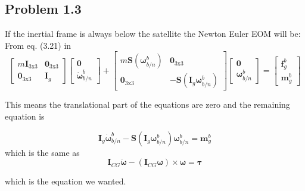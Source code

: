 \subsection*{Problem 1.3}
If the inertial frame is always below the satellite the Newton Euler EOM will be:\\From eq. (3.21) in \cite{Fossen2011}
\begin{equation}
    \begin{bmatrix}
        m\boldsymbol{I}_{3\text{x}3} & \boldsymbol{0}_{3\text{x}3}\\
        \boldsymbol{0}_{3\text{x}3} & \boldsymbol{I}_g
    \end{bmatrix}
    \begin{bmatrix}
        \boldsymbol{0} \\ \dot{\boldsymbol{\omega}}_{b/n}^b
    \end{bmatrix}
    +
    \begin{bmatrix}
        m\boldsymbol{S}(\boldsymbol{\omega}_{b/n}^b) &  \boldsymbol{0}_{3\text{x}3} \\
         \boldsymbol{0}_{3\text{x}3} & -\boldsymbol{S}(\boldsymbol{I}_g\boldsymbol{\omega}_{b/n}^b)
    \end{bmatrix}
        \begin{bmatrix}
        \boldsymbol{0} \\ \boldsymbol{\omega}_{b/n}^b
    \end{bmatrix}
    =
    \begin{bmatrix}
    \boldsymbol{f}_g^b \\ \boldsymbol{m}_g^b
    \end{bmatrix}
\end{equation}

This means the translational part of the equations are zero and the remaining equation is
\begin{subequation}
\begin{equation}
    \boldsymbol{I}_g\dot{\boldsymbol{\omega}}_{b/n}^b -\boldsymbol{S}(\boldsymbol{I}_g\boldsymbol{\omega}_{b/n}^b)\boldsymbol{\omega}_{b/n}^b = \boldsymbol{m}_g^b
\end{equation}
which is the same as 
\begin{equation}
	\label{eq:kinetics}
	\boldsymbol{I}_{CG} \dot{\boldsymbol{\omega}} - (\boldsymbol{I}_{CG} \boldsymbol{\omega}) \times \boldsymbol{\omega} = \boldsymbol{\tau}                                                                 
\end{equation}
\end{subequation}


which is the equation we wanted.


